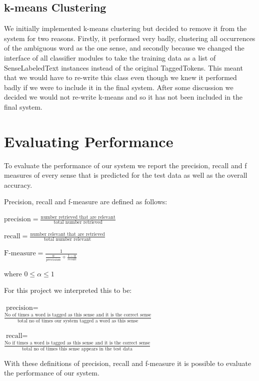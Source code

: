 \documentclass[a4wide,10pt]{article}
\begin{document}
\subsection{k-means Clustering}
We initially implemented k-means clustering but decided to remove it from the
system for two reasons.  Firstly, it performed very badly, clustering all
occurrences of the ambiguous word as the one sense, and secondly because we
changed the interface of all classifier modules to take the training data
as a list of SenseLabeledText instances instead of the original TaggedTokens.
This meant that we would have to re-write this class even though we knew it
performed badly if we were to include it in the final system.  After some
discussion we decided we would not re-write k-means and so it has not been
included in the final system.


\section{Evaluating Performance}

To evaluate the performance of our system we report the precision, recall
and f measures of every sense that is predicted for the test data as well as
the overall accuracy.

Precision, recall and f-measure are defined as follows:\\
\begin{center}
$ \mbox{precision} = \frac{\mbox{number retrieved that are relevant}}
                                {\mbox{total number retrieved}}$
\\
\vspace{5mm}

$ \mbox{recall} = \frac{\mbox{number relevant that are retrieved}}
                        {\mbox{total number relevant}}$
\\
\vspace{5mm}


$ \mbox{F-measure} = \frac{1} { \frac{\alpha} {precision} + \frac{1-\alpha} {recall}} $\\
\vspace{5mm}
\end{center}
where $0 \leq \alpha \leq 1$

For this project we interpreted this to be:\\
\begin{center}
$ \mbox{precision} =$\\
\vspace{5mm}
 $\frac{\mbox{No of times a word is tagged as this sense and it is the correct sense}}  {\mbox{total no of times our system tagged a word as this sense}}$\\
\vspace{1cm}

$ \mbox{recall} =$ \\
\vspace{5mm}
$\frac{\mbox{No if times a word is tagged as this sense and it is the correct sense}} {\mbox{total no of times this sense appears in the test data}}$\\
\end{center}
With these definitions of precision, recall and f-measure it is possible to
evaluate the performance of our system.
\end{document}
